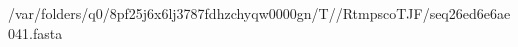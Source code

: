 \documentclass[10pt]{article}
\begin{document}
\begin{texshade}{/var/folders/q0/8pf25j6x6lj3787fdhzchyqw0000gn/T//RtmpscoTJF/seq26ed6e6ae041.fasta}
\hidelogoscale
{}
\showlegend
\end{texshade}
\end{document}

